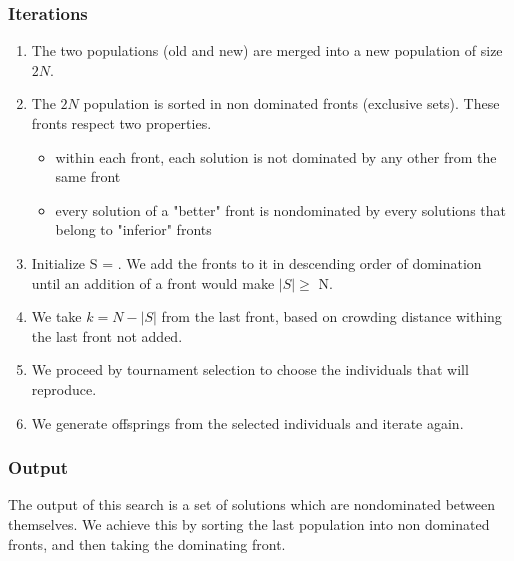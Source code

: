 \documentclass[a4paper, 12pt] {article}
\begin{document}

\subsubsection*{Iterations}
\begin{enumerate}
  \item The two populations (old and new) are merged into a new population of size $2N$.
  \item The $2N$ population is sorted in non dominated fronts (exclusive sets). These fronts respect two properties.	
  \begin{itemize}
    \item within each front, each solution is not dominated by any other from the same front
    \item every solution of a "better" front is nondominated by every solutions that belong to "inferior" fronts
  \end{itemize}
  \item Initialize S = {}. We add the fronts to it in descending order of domination until an addition of a front would make $\left\vert{S}\right\vert \geq$ N. 
  \item We take $k = N - \left\vert{S}\right\vert $ from the last front, based on crowding distance withing the last front not added.
  \item We proceed by tournament selection to choose the individuals that will reproduce.
  \item We generate offsprings from the selected individuals and iterate again.
\end{enumerate}
\subsubsection*{Output}
The output of this search is a set of solutions which are nondominated between themselves. We achieve this by 
sorting the last population into non dominated fronts, and then taking the dominating front.
\end{document}
